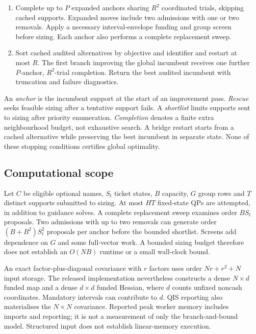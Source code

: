 \documentclass[11pt]{article}
\begin{document}
\begin{enumerate}[leftmargin=*,itemsep=0.45em]
Restart distinct seeds and revisit the completed conditional incumbent.
\item Complete up to $P$ expanded anchors sharing $R^2$ coordinated trials,
skipping cached supports. Expanded moves include two admissions with one or
two removals. Apply a necessary interval-envelope funding and group screen
before sizing. Each anchor also performs a complete replacement sweep.
\item Sort cached audited alternatives by objective and identifier and restart
at most $R$. The first branch improving the global incumbent receives one
further $P$-anchor, $R^2$-trial completion. Return the best audited incumbent
with truncation and failure diagnostics.
\end{enumerate}

An \emph{anchor} is the incumbent support at the start of an improvement pass.
\emph{Rescue} seeks feasible sizing after a tentative support fails.
A \emph{shortlist} limits supports sent to sizing after priority enumeration.
\emph{Completion} denotes a finite extra neighbourhood budget, not exhaustive
search. A bridge restart starts from a cached alternative while preserving
the best incumbent in separate state. None of these stopping conditions
certifies global optimality.

\subsection{Computational scope}
Let $C$ be eligible optional names, $S_t$ ticket states, $B$ capacity, $G$ group
rows and $T$ distinct supports submitted to sizing. At most $HT$ fixed-state
QPs are attempted, in addition to guidance solves. A complete replacement
sweep examines order $BS_t$ proposals. Two admissions with up to two removals
can generate order $(B+B^2)S_t^2$ proposals per anchor before the bounded
shortlist. Screens add dependence on $G$ and some full-vector work. A bounded
sizing budget therefore does not establish an $O(NB)$ runtime or a small
wall-clock bound.

An exact factor-plus-diagonal covariance with $r$ factors uses order
$Nr+r^2+N$ input storage. The released implementation nevertheless constructs
a dense $N\times d$ funded map and a dense $d\times d$ funded Hessian, where
$d$ counts unfixed noncash coordinates. Mandatory intervals can contribute
to $d$. QIS reporting also materialises the $N\times N$ covariance. Reported
peak worker memory includes imports and reporting; it is not a measurement
of only the branch-and-bound model. Structured input does not establish
linear-memory execution.
\end{document}
